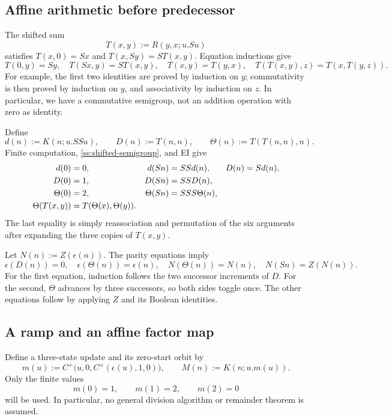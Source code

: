 \documentclass[11pt,letterpaper]{article}
\theoremstyle{definition}\newtheorem{definition}[theorem]{Definition}
\theoremstyle{remark}\newtheorem{remark}[theorem]{Remark}
\begin{document}
\subsection{Affine arithmetic before predecessor}

The shifted sum
\[
 T(x,y):=R(y,x;u.Su)
\]
satisfies $T(x,0)=Sx$ and $T(x,Sy)=S T(x,y)$.
Equation inductions give
\begin{equation}
 T(0,y)=Sy,\quad T(Sx,y)=S T(x,y),\quad
 T(x,y)=T(y,x),\quad
 T(T(x,y),z)=T(x,T(y,z)).
 \label{ss:shifted-semigroup}
\end{equation}
For example, the first two identities are proved by induction on $y$;
commutativity is then proved by induction on $y$, and associativity by
induction on $z$.  In particular, we have a commutative semigroup, not
an addition operation with zero as identity.

Define
\[
 d(n):=K(n;u.SSu),\qquad D(n):=T(n,n),\qquad
 \Theta(n):=T(T(n,n),n).
\]
Finite computation, \eqref{ss:shifted-semigroup}, and EI give
\begin{align}
 d(0)&=0,& d(Sn)&=SSd(n),&D(n)&=Sd(n),\notag\\
 D(0)&=1,&D(Sn)&=SSD(n),\notag\\
 \Theta(0)&=2,&\Theta(Sn)&=SSS\Theta(n),\notag\\
 \Theta(T(x,y))&=T(\Theta(x),\Theta(y)).
 \label{ss:affine-laws}
\end{align}
The last equality is simply reassociation and permutation of the six
arguments after expanding the three copies of $T(x,y)$.

Let $N(n):=Z(\epsilon(n))$.  The parity equations imply
\begin{equation}
 \epsilon(D(n))=0,\quad
 \epsilon(\Theta(n))=\epsilon(n),\quad
 N(\Theta(n))=N(n),\quad N(Sn)=Z(N(n)).
 \label{ss:affine-parity}
\end{equation}
For the first equation, induction follows the two successor increments
of $D$.  For the second, $\Theta$ advances by three successors, so both
sides toggle once.  The other equations follow by applying $Z$ and its
Boolean identities.

\subsection{A ramp and an affine factor map}

Define a three-state update and its zero-start orbit by
\[
 m(u):=C^+\bigl(u,0,C^+(\epsilon(u),1,0)\bigr),\qquad
 M(n):=K(n;u.m(u)).
\]
Only the finite values
\[
 m(0)=1,\qquad m(1)=2,\qquad m(2)=0
\]
will be used.  In particular, no general division algorithm or
remainder theorem is assumed.
\end{document}
